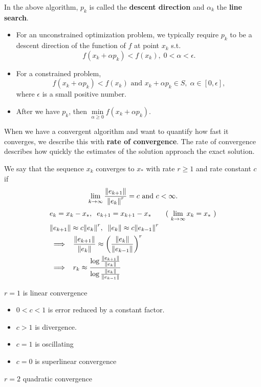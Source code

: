 In the above algorithm, $p_k$ is called the \textbf{descent direction} and $\alpha_k$ the \textbf{line search}.
\begin{itemize}
\item
For an unconstrained optimization problem, we typically require $p_k$ to be a descent direction of the function of $f$ at point $x_k$ s.t. \[ f(x_k + \alpha p_k) < f(x_k) , \; 0< \alpha < \epsilon.\]

\item
For a constrained problem,
\[ f(x_k + \alpha p_k) < f(x_k) \text{ and } x_k + \alpha p_k \in S, \; \alpha \in[0, \epsilon],
\] where $\epsilon$ is a small positive number.

\item After we have $p_k$, then $\min\limits_{\alpha \geq 0} f(x_k + \alpha p_k)$.
\end{itemize}

When we have a convergent algorithm and want to quantify how fast it converges, we describe this with \textbf{rate of convergence}. The rate of convergence describes how quickly the estimates of the solution approach the exact solution.

We say that the sequence ${x_k}$ converges to $x_*$ with rate $r\geq 1$ and rate constant $c$ if
\[ \lim_{k\to\infty} \frac{ \norm{e_{k+1}} }{ \norm{e_k}^r } = c\text{ and }c < \infty.\]
\begin{align*}
&e_k = x_k - x_*,
	\;\; e_{k+1} = x_{k+1} - x_*
	\tag{ $\lim\limits_{k\to\infty} x_k = x_*$ }  \\
& \norm{e_{k+1}} \approx c\norm{e_k}^r,
	\;\; \norm{e_k} \approx c\norm{e_{k-1}}^r \\
& \implies \;\;
	\frac{ \norm{ e_{k+1} } }
		{ \norm{ e_k } }
		\approx \left( \frac{ \norm{ e_k } }{ \norm{ e_{k-1} } } \right)^r \\
&\implies \;\;
	r_k \approx \frac
		{
			\log \frac
			{
				\norm{e_{k+1} }
			}
			{
				\norm{e_k}
			}
		}
		{ \log \frac{ \norm{e_k} }{ \norm{ e_{k-1} } }
		}
\end{align*}

$r=1$ is linear convergence

\begin{itemize}
\item
$0 < c < 1$ is error reduced by a constant factor.
\item
$c > 1$ is divergence.
\item
$c = 1$ is oscillating
\item
$c = 0$ is superlinear convergence
\end{itemize}


$r = 2$ quadratic convergence

